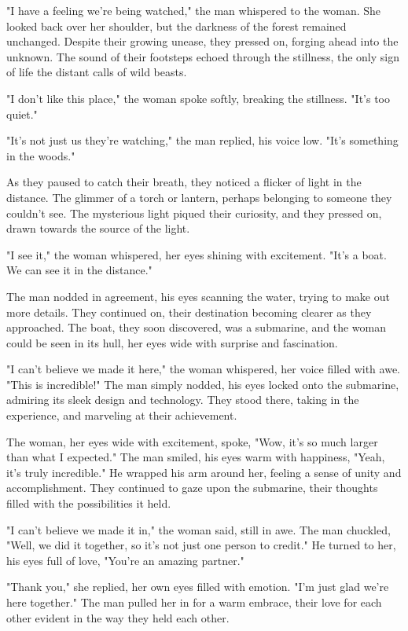 \documentclass[smalldemyvopaper,11pt,twoside,onecolumn,openright,extrafontsizes]{memoir}
\begin{document}
"I have a feeling we're being watched," the man whispered to the woman. She looked back over her shoulder, but the darkness of the forest remained unchanged. Despite their growing unease, they pressed on, forging ahead into the unknown. The sound of their footsteps echoed through the stillness, the only sign of life the distant calls of wild beasts.\par
"I don't like this place," the woman spoke softly, breaking the stillness. "It's too quiet."\par
"It's not just us they're watching," the man replied, his voice low. "It's something in the woods."\par
As they paused to catch their breath, they noticed a flicker of light in the distance. The glimmer of a torch or lantern, perhaps belonging to someone they couldn't see. The mysterious light piqued their curiosity, and they pressed on, drawn towards the source of the light.\par
"I see it," the woman whispered, her eyes shining with excitement. "It's a boat. We can see it in the distance."\par
The man nodded in agreement, his eyes scanning the water, trying to make out more details. They continued on, their destination becoming clearer as they approached. The boat, they soon discovered, was a submarine, and the woman could be seen in its hull, her eyes wide with surprise and fascination.\par
"I can't believe we made it here," the woman whispered, her voice filled with awe. "This is incredible!" The man simply nodded, his eyes locked onto the submarine, admiring its sleek design and technology. They stood there, taking in the experience, and marveling at their achievement.\par
The woman, her eyes wide with excitement, spoke, "Wow, it's so much larger than what I expected." The man smiled, his eyes warm with happiness, "Yeah, it's truly incredible." He wrapped his arm around her, feeling a sense of unity and accomplishment. They continued to gaze upon the submarine, their thoughts filled with the possibilities it held.\par
"I can't believe we made it in," the woman said, still in awe. The man chuckled, "Well, we did it together, so it's not just one person to credit." He turned to her, his eyes full of love, "You're an amazing partner."\par
"Thank you," she replied, her own eyes filled with emotion. "I'm just glad we're here together." The man pulled her in for a warm embrace, their love for each other evident in the way they held each other.\par
\end{document}

